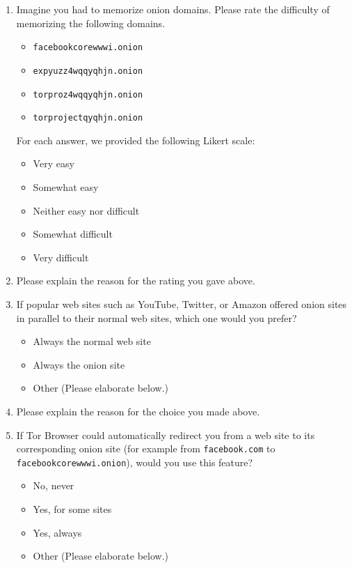 \begin{enumerate}
    \item Imagine you had to memorize onion domains. Please rate the difficulty
        of memorizing the following domains.
        \begin{itemize}
            \item \texttt{facebookcorewwwi.onion}
            \item \texttt{expyuzz4wqqyqhjn.onion}
            \item \texttt{torproz4wqqyqhjn.onion}
            \item \texttt{torprojectqyqhjn.onion}
        \end{itemize}
        For each answer, we provided the following Likert scale:
        \begin{itemize}
            \item Very easy
            \item Somewhat easy
            \item Neither easy nor difficult
            \item Somewhat difficult
            \item Very difficult
        \end{itemize}

    \item Please explain the reason for the rating you gave above.

    \item If popular web sites such as YouTube, Twitter, or Amazon offered
        onion sites in parallel to their normal web sites, which one would you
        prefer?
        \begin{itemize}[label=$\Circle$]
            \item Always the normal web site
            \item Always the onion site
            \item Other (Please elaborate below.)
        \end{itemize}

    \item Please explain the reason for the choice you made above.

    \item If Tor Browser could automatically redirect you from a web site to
        its corresponding onion site (for example from \texttt{facebook.com} to
        \texttt{facebookcorewwwi.onion}), would you use this feature?
        \begin{itemize}[label=$\Circle$]
            \item No, never
            \item Yes, for some sites
            \item Yes, always
            \item Other (Please elaborate below.)
        \end{itemize}


\end{enumerate}
